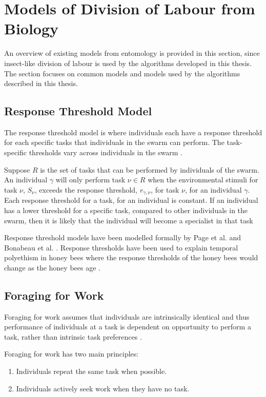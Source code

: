 \section{Models of Division of Labour from Biology}

An overview of existing models from entomology is provided in this section, since insect-like division of labour is used by the algorithms developed in this thesis. The section focuses on common models and models used by the algorithms described in this thesis.

\subsection{Response Threshold Model}
\label{responsethresholdmodel}

The response threshold model is where individuals each have a response threshold for each specific tasks that individuals in the swarm can perform.  The task-specific thresholds vary across individuals in the swarm \cite{robinson1989genetic}.

Suppose $R$ is the set of tasks that can be performed by individuals of the swarm. An individual $\gamma$ will only perform task $\nu \in R$ when the environmental stimuli for task $\nu$, $S_\nu$, exceeds the response threshold, $r_{\gamma,\nu}$, for task $\nu$, for an individual $\gamma$. Each response threshold for a task, for an individual is constant. If an individual has a lower threshold for a specific task, compared to other individuals in the swarm, then it is likely that the individual will become a specialist in that task \cite{robinson1989genetic}

Response threshold models have been modelled formally by Page et al. \cite{page1990self} and Bonabeau et al. \cite{bonabeau1999role}. Response thresholds have been used to explain temporal polyethism in honey bees where the response thresholds of the honey bees would change as the honey bees age \cite{robinson1987regulation}.

\subsection{Foraging for Work}

Foraging for work assumes that individuals are intrinsically identical and thus performance of individuals at a task is dependent on opportunity to perform a task, rather than intrinsic task preferences \cite{franks1994foraging}.

Foraging for work has two main principles:
\begin{enumerate}
	\item Individuals repeat the same task when possible.
	\item Individuals actively seek work when they have no task.
\end{enumerate}

